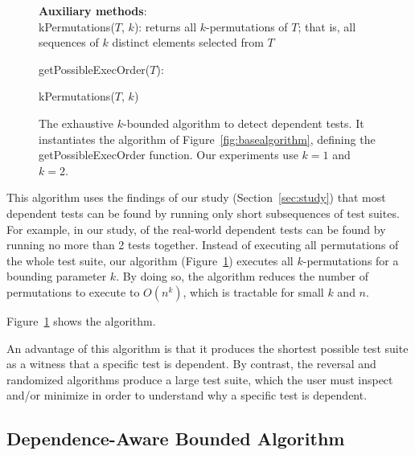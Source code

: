 \begin{figure}[t]
\textbf{Auxiliary methods}:\\
kPermutations($T$, $k$): returns all $k$-permutations of $T$; that is, all
sequences of $k$ distinct elements selected from $T$

\medskip

getPossibleExecOrder($T$):\\
\bigsqueeze
\begin{algorithmic}[1]
\RETURN kPermutations($T$, $k$)
\end{algorithmic}

\caption {The exhaustive $k$-bounded algorithm to detect dependent tests.
It instantiates the algorithm of Figure~\ref{fig:basealgorithm}, defining the
getPossibleExecOrder function.
Our experiments use $k=1$ and $k=2$.
} 
\label{fig:exhaustivealgorithm}
\end{figure}



This algorithm uses the findings of our study
(Section~\ref{sec:study})
that most dependent tests can be found by running only short
subsequences of test suites. For example,
in our study, \dtrate of the real-world dependent tests
can be found by running no more than 2 tests together.
Instead of executing all permutations of the
whole test suite, our algorithm (Figure~\ref{fig:exhaustivealgorithm})
executes all $k$-permutations for a bounding
parameter $k$.
By doing so, the algorithm reduces
the number of permutations to execute
to $O(n^k)$, which is tractable for small $k$ and $n$. 


Figure~\ref{fig:exhaustivealgorithm} shows the algorithm.


An advantage of this algorithm is that it produces the shortest possible 
test suite as a witness that a specific test is dependent.  By contrast,
the reversal and randomized algorithms produce a large test suite, which
the user must inspect and/or minimize in order to understand why a specific
test is dependent.


\subsection{Dependence-Aware Bounded Algorithm}
\label{sec:advalgorithm}



